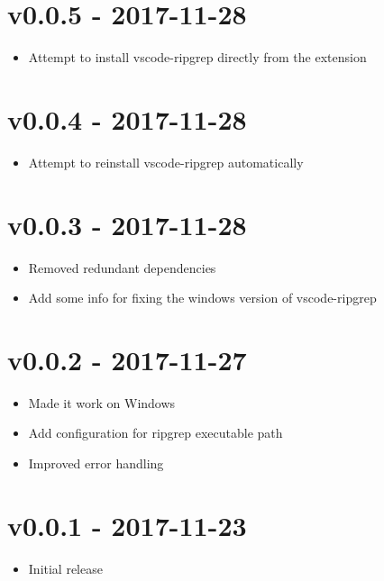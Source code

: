 \chapter{v0.0.5 - 2017-11-28}
\begin{itemize}
\item{Attempt to install vscode-ripgrep directly from the extension}
\end{itemize}

\chapter{v0.0.4 - 2017-11-28}
\begin{itemize}
\item{Attempt to reinstall vscode-ripgrep automatically}
\end{itemize}

\chapter{v0.0.3 - 2017-11-28}
\begin{itemize}
\item{Removed redundant dependencies}
\item{Add some info for fixing the windows version of vscode-ripgrep}
\end{itemize}

\chapter{v0.0.2 - 2017-11-27}
\begin{itemize}
\item{Made it work on Windows}
\item{Add configuration for ripgrep executable path}
\item{Improved error handling}
\end{itemize}

\chapter{v0.0.1 - 2017-11-23}
\begin{itemize}
\item{Initial release}
\end{itemize}
